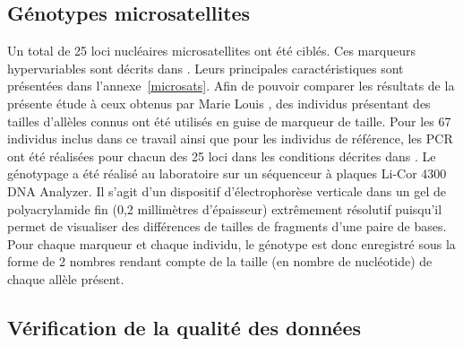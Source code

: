 \documentclass[a4paper,12pt,twoside]{article}\usepackage[]{graphicx}\usepackage[]{color}
\begin{document}
\begin {bibunit} [newbst]
\subsection{Génotypes microsatellites}
Un total de 25 loci nucléaires microsatellites ont été ciblés. Ces marqueurs hypervariables sont décrits dans \citet{louis2014}. Leurs principales caractéristiques sont présentées dans l'annexe~\ref{microsats}. Afin de pouvoir comparer les résultats de la présente étude à ceux obtenus par Marie Louis \citep{louis2014}, des individus présentant des tailles d'allèles connus ont été utilisés en guise de marqueur de taille. Pour les 67 individus inclus dans ce travail ainsi que pour les individus de référence, les PCR ont été réalisées pour chacun des 25 loci dans les conditions décrites dans \citet{louis2014}. Le génotypage a été réalisé au laboratoire sur un séquenceur à plaques Li-Cor 4300 DNA Analyzer. Il s'agit d'un dispositif d'électrophorèse verticale dans un gel de polyacrylamide fin (0,2 millimètres d'épaisseur) extrêmement résolutif puisqu'il permet de visualiser des différences de tailles de fragments d'une paire de bases. Pour chaque marqueur et chaque individu, le génotype est donc enregistré sous la forme de 2 nombres rendant compte de la taille (en nombre de nucléotide) de chaque allèle présent.


\subsection{Vérification de la qualité des données}


\end{bibunit}
\end{document}
